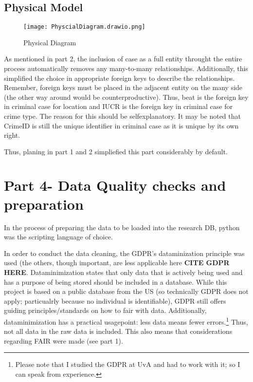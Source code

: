 \documentclass[a4paper]{article}
\begin{document}
\subsection{Physical Model}


\begin{figure}[htp]
		\centering
			\texttt{[image: PhyscialDiagram.drawio.png]}
         \small
         \caption{Physical Diagram}
\end{figure}

As mentioned in part 2, the inclusion of case as a full entity throught the entire process automatically removes any many-to-many relationships. Additionally, this simplified the choice in appropriate foreign keys to describe the relationships. Remember, foreign keys must be placed in the adjacent entity on the many side (the other way around would be counterproductive). Thus, beat is the foreign key in criminal case for location and IUCR is the foreign key in criminal case for crime type. The reason for this should be selfexplanatory. It may be noted that CrimeID is still the unique identifier in criminal case as it is unique by its own right. 

Thus, planing in part 1 and 2 simpliefied this part considerably by default. 


\section{Part 4- Data Quality checks and preparation}

In the process of preparing the data to be loaded into the research DB, python was the scripting language of choice.

In order to conduct the data cleaning, the GDPR's dataminization principle was used (the others, though important, are less applicable here \textbf{CITE GDPR HERE}. Dataminimization states that only data that is actively being used and has a purpose of being stored should be included in a database. While this project is based on a public database from the US (so technically GDPR does not apply; particualrly because no individual is identifiable), GDPR still offers guiding principles/standards on how to fair with data. Additionally, dataminimization has a practical usagepoint: less data means fewer errors.\footnote{Please note that I studied the GDPR at UvA and had to work with it; so I can speak from experience.} Thus, not all data in the raw data is included. This also means that considerations regarding FAIR were made (see part 1). 
\end{document}
